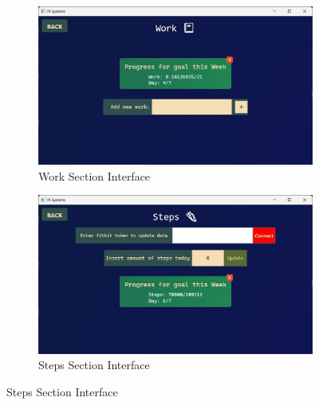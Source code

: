 \documentclass[11pt]{article}
\begin{document}
\begin{figure}[!ht]
  \centering
  \begin{subfigure}{0.4\linewidth}
    \includegraphics[width = \linewidth]{Work Screen}
    \caption{Work Section Interface}
    \label{fig:Work}
  \end{subfigure}%
  \vspace{10pt}
  \hfill
  \begin{subfigure}{0.4\linewidth}
    \includegraphics[width = \linewidth]{Steps Screen}
    \caption{Steps Section Interface}
    \label{fig:Steps}
  \end{subfigure}


\end{figure}
\end{document}

